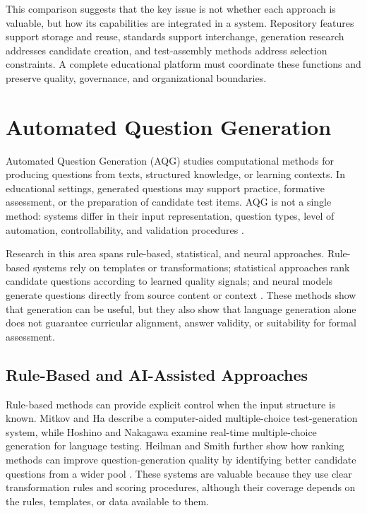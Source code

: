 This comparison suggests that the key issue is not whether each approach is valuable, but how its capabilities are integrated in a system. Repository features support storage and reuse, standards support interchange, generation research addresses candidate creation, and test-assembly methods address selection constraints. A complete educational platform must coordinate these functions and preserve quality, governance, and organizational boundaries.

\section{Automated Question Generation}

Automated Question Generation (AQG) studies computational methods for producing questions from texts, structured knowledge, or learning contexts. In educational settings, generated questions may support practice, formative assessment, or the preparation of candidate test items. AQG is not a single method: systems differ in their input representation, question types, level of automation, controllability, and validation procedures \cite{kurdi2020}.

Research in this area spans rule-based, statistical, and neural approaches. Rule-based systems rely on templates or transformations; statistical approaches rank candidate questions according to learned quality signals; and neural models generate questions directly from source content or context \cite{mitkovHa2003,hoshinoNakagawa2005,heilmanSmith2010,du2017,kurdi2020}. These methods show that generation can be useful, but they also show that language generation alone does not guarantee curricular alignment, answer validity, or suitability for formal assessment.

\subsection{Rule-Based and AI-Assisted Approaches}

Rule-based methods can provide explicit control when the input structure is known. Mitkov and Ha describe a computer-aided multiple-choice test-generation system, while Hoshino and Nakagawa examine real-time multiple-choice generation for language testing. Heilman and Smith further show how ranking methods can improve question-generation quality by identifying better candidate questions from a wider pool \cite{mitkovHa2003,hoshinoNakagawa2005,heilmanSmith2010}. These systems are valuable because they use clear transformation rules and scoring procedures, although their coverage depends on the rules, templates, or data available to them.

